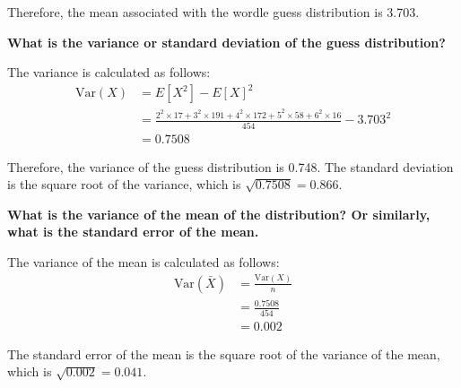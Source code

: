 \documentclass{article}
\begin{document}
Therefore, the mean associated with the wordle guess distribution is 3.703.

\textbf{What is the variance or standard deviation of the guess distribution?}

The variance is calculated as follows:
\begin{align*}
    \text{Var}(X) & = E[X^2] - E[X]^2 \\
    & = \frac{2^2 \times 17 + 3^2 \times 191 + 4^2 \times 172 + 5^2 \times 58 + 6^2 \times 16}{454} - 3.703^2 \\
    &= 0.7508
\end{align*}

Therefore, the variance of the guess distribution is 0.748. The standard deviation is the square root of the variance, which is $\sqrt{0.7508} = 0.866$.

\textbf{What is the variance of the mean of the distribution? Or similarly, what is the standard error of the mean.}

The variance of the mean is calculated as follows:
\begin{align*}
    \text{Var}(\bar{X}) & = \frac{\text{Var}(X)}{n} \\
    & = \frac{0.7508}{454} \\
    & = 0.002
\end{align*}

The standard error of the mean is the square root of the variance of the mean, which is $\sqrt{0.002} = 0.041$.

\end{document}
